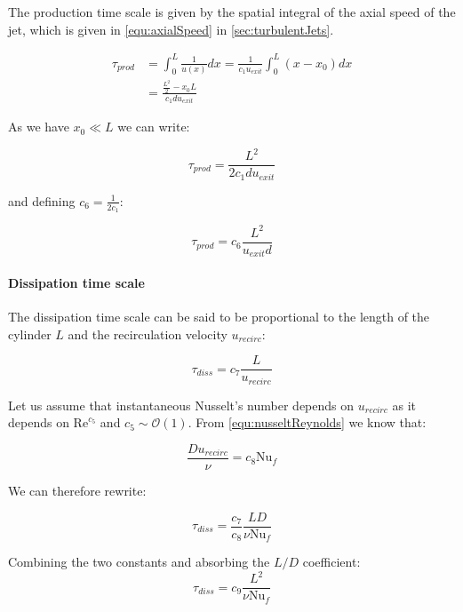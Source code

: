 The production time scale is given by the spatial integral of the axial speed of the jet, which is given in \cref{equ:axialSpeed} in \cref{sec:turbulentJets}.

\begin{equation}
\begin{aligned}
\tau_{prod} &= \int_{0}^{L} \frac{1}{u(x)} dx = \frac{1}{c_1 u_{exit}} \int_0^L \left( x - x_0 \right) dx \\[2ex]
 &= \frac{\frac{L^2}{2} - x_0L}{c_1du_{exit}}
\end{aligned}
\end{equation}

\noindent As we have $x_0\ll L$ we can write:

\begin{equation}
\tau_{prod} = \frac{L^2}{2c_1du_{exit}}
\end{equation}

\noindent and defining $c_6 = \frac{1}{2c_1}$:

\begin{equation}
\tau_{prod} = c_6 \frac{L^2}{u_{exit} d}
\end{equation}

\paragraph{Dissipation time scale}
The dissipation time scale can be said to be proportional to the length of the cylinder $L$ and the recirculation velocity $u_{recirc}$: 

\begin{equation}
\tau_{diss} = c_7 \frac{L}{u_{recirc}}
\end{equation}

\noindent Let us assume that instantaneous Nusselt's number depends on $u_{recirc}$ as it depends on $\text{Re}^{c_5}$ and $c_5\sim\mathcal{O}(1)$. From \cref{equ:nusseltReynolds} we know that: 

\begin{equation}
\frac{D u_{recirc}}{\nu} = c_8 \text{Nu}_f
\end{equation}

\noindent We can therefore rewrite:

\begin{equation}
\tau_{diss} = \frac{c_7}{c_8} \frac{LD}{\nu \text{Nu}_f}
\end{equation}

\noindent Combining the two constants and absorbing the $L/D$ coefficient:
\begin{equation}
\tau_{diss} = c_9 \frac{L^2}{\nu \text{Nu}_f}
\end{equation}

